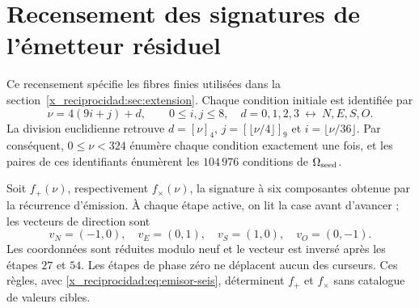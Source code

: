 \chapter{Recensement des signatures de l’émetteur résiduel}
\label{x_reciprocidad:app:firmas-emision}

Ce recensement spécifie les fibres finies utilisées dans la section~\ref{x_reciprocidad:sec:extension}.
Chaque condition initiale est identifiée par
\[
 \nu=4(9i+j)+d,\qquad 0\leq i,j\leq8,\quad
 d=0,1,2,3\ \longleftrightarrow\ N,E,S,O.
\]
La division euclidienne retrouve \(d=[\nu]_4\), \(j=[\lfloor\nu/4\rfloor]_9\)
et \(i=\lfloor\nu/36\rfloor\). Par conséquent, \(0\leq\nu<324\) énumère
chaque condition exactement une fois, et les paires de ces identifiants
énumèrent les \(104\,976\) conditions de \(\Omega_{\rm seed}\).

Soit \(f_+(\nu)\), respectivement \(f_\times(\nu)\), la signature à six
composantes obtenue par la récurrence d’émission. À chaque étape active, on lit
la case avant d’avancer ; les vecteurs de direction sont
\[
 v_N=(-1,0),\quad v_E=(0,1),\quad v_S=(1,0),\quad v_O=(0,-1).
\]
Les coordonnées sont réduites modulo neuf et le vecteur est inversé après les étapes \(27\) et \(54\). Les étapes de phase zéro ne déplacent aucun des curseurs. Ces règles, avec \eqref{x_reciprocidad:eq:emisor-seis}, déterminent \(f_+\) et \(f_\times\) sans catalogue de valeurs cibles.


